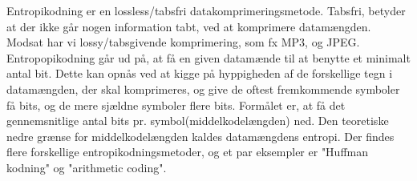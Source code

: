 Entropikodning er en lossless/tabsfri datakomprimeringsmetode. Tabsfri, betyder at der ikke går nogen information tabt, ved at komprimere datamængden. Modsat har vi lossy/tabsgivende komprimering, som fx MP3, og JPEG. Entropopikodning går ud på, at få en given datamænde til at benytte et minimalt antal bit. Dette kan opnås ved at kigge på hyppigheden af de forskellige tegn i datamængden, der skal komprimeres, og give de oftest fremkommende symboler få bits, og de mere sjældne symboler flere bits. Formålet er, at få det gennemsnitlige antal bits pr. symbol(middelkodelængden) ned. Den teoretiske nedre grænse for middelkodelængden kaldes datamængdens entropi. \cite{entro1}
Der findes flere forskellige entropikodningsmetoder, og et par eksempler er "Huffman kodning" og "arithmetic coding".
